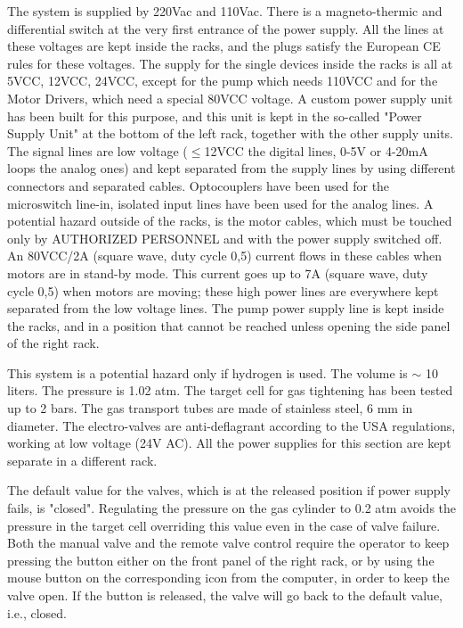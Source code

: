 The system is supplied by 220Vac and 110Vac. There is a  magneto-thermic and
differential switch at the very first entrance of the power supply. 
All the lines at these voltages are kept inside the racks, and the plugs 
satisfy the European CE rules for these voltages. 
The supply for the single devices inside the racks is all
at 5VCC, 12VCC, 24VCC, except for the pump which needs 110VCC and
for the Motor Drivers, which need a special 80VCC voltage. A custom
power supply unit has been built for this purpose, and this unit is kept in the
so-called "Power Supply Unit" at the bottom of the left rack, together with the
other supply units. The signal lines are low voltage ($\le$12VCC the digital
lines, 0-5V or 4-20mA loops the analog ones) and kept separated from the
supply lines by using different connectors and separated cables.
Optocouplers have been used for the microswitch line-in, isolated input
lines have been used for the analog lines. A potential hazard outside of
the racks, is the motor cables, which must be touched only
by AUTHORIZED PERSONNEL and with the power supply switched
off. An 80VCC/2A (square wave, duty cycle 0,5) current flows in
these cables when motors are in stand-by mode. This current goes up
to 7A (square wave, duty cycle 0,5) when motors are moving;
these high power lines are everywhere kept separated from the
low voltage lines. The pump power supply line is
kept inside the racks, and in a position that cannot be reached
unless opening the side panel of the right rack. \\


This system is a potential hazard only if hydrogen is used. The 
volume is $\sim$ 10 liters.  The pressure is 1.02 atm. 
The target cell for gas tightening has been tested up to 2 bars.  
The gas transport tubes are made of stainless steel, 6 mm in 
diameter. The electro-valves are anti-deflagrant according to the USA 
regulations, working at low voltage (24V AC). All the power supplies for 
this section are kept separate in a different rack.

 The default value for the valves, which is at the released position if
power supply fails, is "closed". Regulating the pressure 
on the gas cylinder to 0.2 atm avoids the pressure in the target cell 
overriding this value even in the case of valve failure. Both the
manual valve and the remote valve control require
the operator to keep pressing the button either on the front panel of the 
right rack, or by using the mouse button on the corresponding
icon from the computer, 
in order to keep the valve open. If the button is released,
the valve will go back to the default value, i.e., closed.  

